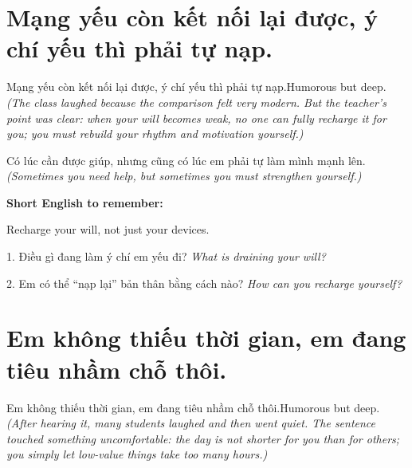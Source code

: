 \section{Mạng yếu còn kết nối lại được, ý chí yếu thì phải tự nạp.}
\begin{truyen}{Mạng yếu còn kết nối lại được, ý chí yếu thì phải tự nạp.}{Humorous but deep.}
\textit{(The class laughed because the comparison felt very modern. But the teacher's point was clear: when your will becomes weak, no one can fully recharge it for you; you must rebuild your rhythm and motivation yourself.)}
\end{truyen}

\begin{baihoc}
Có lúc cần được giúp, nhưng cũng có lúc em phải tự làm mình mạnh lên.
\textit{(Sometimes you need help, but sometimes you must strengthen yourself.)}
\end{baihoc}

\begin{ghinhoanh}
\textbf{Short English to remember:}

Recharge your will, not just your devices.

\end{ghinhoanh}

\begin{tuhocnhanh}
1. Điều gì đang làm ý chí em yếu đi? \textit{What is draining your will?}

2. Em có thể “nạp lại” bản thân bằng cách nào? \textit{How can you recharge yourself?}
\end{tuhocnhanh}
\ngancach

\section{Em không thiếu thời gian, em đang tiêu nhầm chỗ thôi.}
\begin{truyen}{Em không thiếu thời gian, em đang tiêu nhầm chỗ thôi.}{Humorous but deep.}
\textit{(After hearing it, many students laughed and then went quiet. The sentence touched something uncomfortable: the day is not shorter for you than for others; you simply let low-value things take too many hours.)}
\end{truyen}

